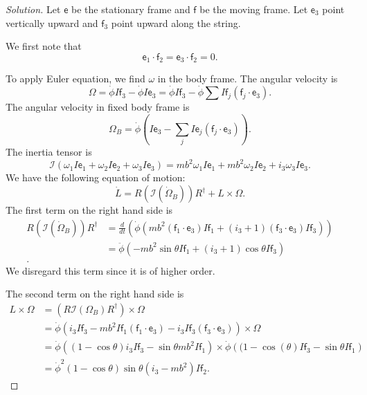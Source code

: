 \begin{proof}[Solution]
	Let $\mathsf{e}$ be the stationary frame and $\mathsf{f}$ be the moving frame. Let $\mathsf{e}_3$ point vertically upward and $\mathsf{f}_3$ point upward along the string.

	We first note that
	\[
		\mathsf{e}_1 \cdot \mathsf{f}_2 
		= \mathsf{e}_3 \cdot \mathsf{f}_2 = 0 
	.\] 

	To apply Euler equation, we find $\omega$ in the body frame. The angular velocity is
	\[
		\Omega = \dot{\phi} I\mathsf{f}_3 - \dot{\phi}I\mathsf{e}_3 = \dot{\phi} I \mathsf{f}_3 - \dot{\phi} \sum I\mathsf{f}_j \left( \mathsf{f}_j \cdot \mathsf{e}_3 \right) 
	.\] 
	The angular velocity in fixed body frame is
	\[
		\Omega_B = \dot{\phi}\left(I \mathsf{e}_3 - \sum_j I \mathsf{e}_j \left( \mathsf{f}_j \cdot  \mathsf{e}_3 \right) \right)
	.\] 
	The inertia tensor is 
	\[
		\mathcal{I}(\omega_1 I\mathsf{e}_1 + \omega_2 I \mathsf{e}_2 + \omega_3 I \mathsf{e}_3) = mb^2 \omega_1 I\mathsf{e}_1 + mb^2 \omega_2 I\mathsf{e}_2 + i_3 \omega_3 I\mathsf{e}_3
	.\] 
	We have the following equation of motion:
	\[
		\dot{L} = R\left( \mathcal{I}(\dot{\Omega}_B) \right) R^{\dag} + L \times \Omega
	.\] 
	The first term on the right hand side is
	\begin{align*}
		R\left( \mathcal{I}(\dot{\Omega}_B) \right) R^{\dag}
		&= \frac{d}{dt}(\dot{\phi} (mb^2 (\mathsf{f}_1 \cdot \mathsf{e}_3) I\mathsf{f}_1 + (i_3+ 1) (\mathsf{f}_3 \cdot \mathsf{e}_3) I \mathsf{f}_3 ))\\
		&= \ddot{\phi}  (-mb^2 \sin \theta I\mathsf{f}_1 + (i_3+ 1) \cos \theta I \mathsf{f}_3 )\\
	.\end{align*}
	We disregard this term since it is of higher order.

	The second term on the right hand side is
	\begin{align*}
		L \times \Omega
		&= (R \mathcal{I}(\Omega_B) R^{\dag} ) \times \Omega \\
		&= \dot{\phi}\left( i_3 I \mathsf{f}_3 - mb^2 I\mathsf{f}_1 \left( \mathsf{f}_1 \cdot \mathsf{e}_3 \right) - i_3 I\mathsf{f}_3 (\mathsf{f}_3 \cdot \mathsf{e}_3) \right) \times \Omega \\
		&= \dot{\phi}\left( (1 - \cos \theta) i_3 I \mathsf{f}_3 - \sin \theta mb^2 I \mathsf{f}_1  \right) \times \dot{\phi}\left( (1 - \cos(\theta)  I \mathsf{f}_3 - \sin \theta I \mathsf{f}_1 \right)  \\
		&= \dot{\phi}^2 (1 - \cos \theta) \sin \theta(i_3 - m b^2) I \mathsf{f}_2
	.\end{align*}


\end{proof}
